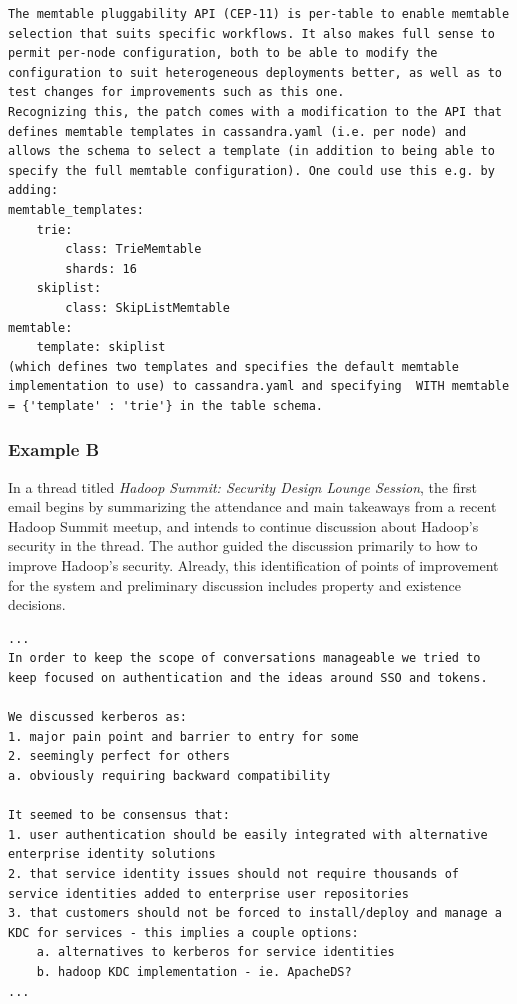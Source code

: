 \documentclass[a4paper, 12pt]{article}
\begin{document}
			\begin{verbatim}
The memtable pluggability API (CEP-11) is per-table to enable memtable selection that suits specific workflows. It also makes full sense to permit per-node configuration, both to be able to modify the configuration to suit heterogeneous deployments better, as well as to test changes for improvements such as this one. 
Recognizing this, the patch comes with a modification to the API that defines memtable templates in cassandra.yaml (i.e. per node) and allows the schema to select a template (in addition to being able to specify the full memtable configuration). One could use this e.g. by adding:
memtable_templates:
	trie:
		class: TrieMemtable
		shards: 16
	skiplist:
		class: SkipListMemtable
memtable:
	template: skiplist 
(which defines two templates and specifies the default memtable implementation to use) to cassandra.yaml and specifying  WITH memtable = {'template' : 'trie'} in the table schema.
			\end{verbatim}
		
		\subsubsection{Example B}
			In a thread titled \textit{Hadoop Summit: Security Design Lounge Session}, the first email begins by summarizing the attendance and main takeaways from a recent Hadoop Summit meetup, and intends to continue discussion about Hadoop's security in the thread. The author guided the discussion primarily to how to improve Hadoop's security. Already, this identification of points of improvement for the system and preliminary discussion includes property and existence decisions.
			
			\begin{verbatim}
...
In order to keep the scope of conversations manageable we tried to keep focused on authentication and the ideas around SSO and tokens.

We discussed kerberos as:
1. major pain point and barrier to entry for some
2. seemingly perfect for others
a. obviously requiring backward compatibility

It seemed to be consensus that:
1. user authentication should be easily integrated with alternative enterprise identity solutions
2. that service identity issues should not require thousands of service identities added to enterprise user repositories
3. that customers should not be forced to install/deploy and manage a KDC for services - this implies a couple options:
	a. alternatives to kerberos for service identities
	b. hadoop KDC implementation - ie. ApacheDS?
...
			\end{verbatim}
			
\end{document}
